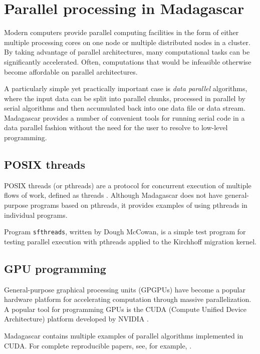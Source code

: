 \chapter{Parallel processing in Madagascar}

Modern computers provide parallel computing facilities in the form of
either multiple processing cores on one node or multiple distributed
nodes in a cluster. By taking advantage of parallel architectures,
many computational tasks can be significantly accelerated. Often,
computations that would be infeasible otherwise become affordable on
parallel architectures.

A particularly simple yet practically important case is \emph{data
  parallel} algorithms, where the input data can be split into
parallel chunks, processed in parallel by serial algorithms and then
accumulated back into one data file or data stream. Madagascar
provides a number of convenient tools for running serial code in a
data parallel fashion without the need for the user to resolve to
low-level programming.

\section{POSIX threads}

POSIX threads (or pthreads) are a protocol for concurrent execution of
multiple flows of work, defined as threads \cite[]{pthreads}. Although
Madagascar does not have general-purpose programs based on pthreads,
it provides examples of using pthreads in individual programs.

Program \texttt{sfthreads}, written by Dough McCowan, is a simple test
program for testing parallel execution with pthreads applied to the
Kirchhoff migration kernel.

\section{GPU programming}

General-purpose graphical processing units (GPGPUs) have become a
popular hardware platform for accelerating computation through massive
parallelization. A popular tool for programming GPUs is the CUDA
(Compute Unified Device Architecture) platform developed by NVIDIA
\cite[]{sanders2010cuda}.

Madagascar contains multiple examples of parallel algorithms
implemented in CUDA. For complete reproducible papers, see, for
example,
\cite[]{monsegny2013shortest,weiss2013solving,yang2014rtm,yang2015graphics,wang2019cu}.

